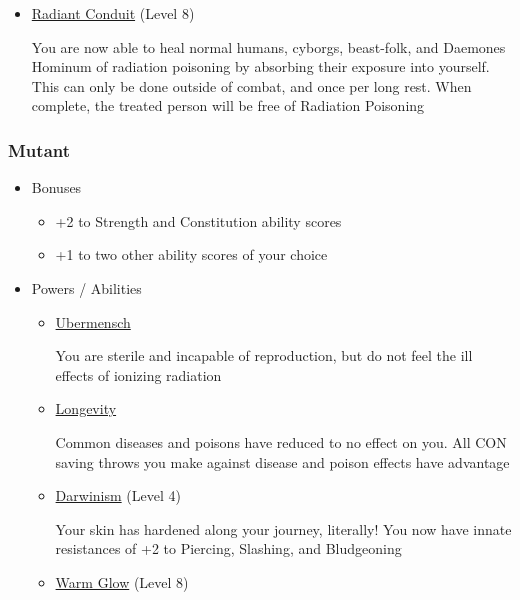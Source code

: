 \documentclass[12pt, landscape]{article}
\begin{document}
\begin{FlushLeft}
\begin{multicols}{2}
\begin{itemize}[wide]
\begin{itemize}
					Per the player’s choice, a symbiotic plant (?) has begun growing out of somewhere on your body.
					You now regenerate health at a rate of +2 per hour in direct sunlight. In overcast weather, the rate is halved

					\item \underline{Radiant Conduit} (Level 8)

					You are now able to heal normal humans, cyborgs, beast-folk, and Daemones Hominum of radiation poisoning by absorbing their exposure into yourself.
					This can only be done outside of combat, and once per long rest.
					When complete, the treated person will be free of Radiation Poisoning
				\end{itemize}
			\end{itemize}
			\vfill \pagebreak

			\subsubsection{Mutant}
			\begin{itemize}[wide]
				\item Bonuses
				\begin{itemize}
					\item +2 to Strength and Constitution ability scores
					\item +1 to two other ability scores of your choice
				\end{itemize}
				\item Powers / Abilities
				\begin{itemize}
					\item \underline{Ubermensch}

					You are sterile and incapable of reproduction, but do not feel the ill effects of ionizing radiation

					\item \underline{Longevity}

					Common diseases and poisons have reduced to no effect on you.
					All CON saving throws you make against disease and poison effects have advantage

					\item \underline{Darwinism} (Level 4)

					Your skin has hardened along your journey, literally!
					You now have innate resistances of +2 to Piercing, Slashing, and Bludgeoning

					\item \underline{Warm Glow} (Level 8)


\end{itemize}
\end{itemize}
\end{multicols}
\end{FlushLeft}
\end{document}
